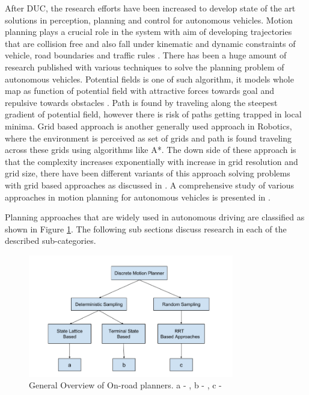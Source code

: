 After DUC, the research efforts have been increased to develop state of the art solutions in perception, planning and control for autonomous vehicles. Motion planning plays a crucial role in the system with aim of developing trajectories that are collision free and also fall under kinematic and dynamic constraints of vehicle, road boundaries and traffic rules \cite{motion_planning_techniques}. There has been a huge amount of research published with various techniques to solve the planning problem of autonomous vehicles. Potential fields is one of such algorithm, it models whole map as function of potential field with attractive forces towards goal and repulsive towards obstacles \cite{potential_field_3} \cite{potential_field_1} \cite{potential_field_2}. Path is found by traveling along the steepest gradient of potential field, however there is risk of paths getting trapped in local minima. Grid based approach is another generally used approach in Robotics, where the environment is perceived as set of grids and path is found traveling across these grids using algorithms like A*. The down side of these approach is that the complexity increases exponentially with increase in grid resolution and grid size, there have been different variants of this approach solving  problems with grid based approaches as discussed in \cite{A_star} \cite{D_star_1} \cite{kolski_thesis}. A comprehensive study of various approaches in motion planning for autonomous vehicles is presented in \cite{motion_planning_techniques} \cite{survey_planning_techniques}. 

 Planning approaches that are widely used in autonomous driving are classified as shown in Figure \ref{related_work_classification}. The following sub sections discuss research in each of the described sub-categories. 

\begin{figure}[H]
	\centering
	\includegraphics[width=0.8\textwidth]{Images/related_work/planning_division.png}
	\caption{General Overview of On-road planners. a - \cite{cmu_parallel_thesis}  \cite{diss_shui_phd_thesis} \cite{traj_planner_optimization} \cite{lattice_Gu_Tiyanu} \cite{unit_A_star} , b - \cite{kolski_thesis} \cite{real_time_traj_plan_article} \cite{darpa_urban_challenge}, c -\cite{rrt_star} \cite{rrt_urban_driv} \cite{mit_rrt}
	}
	\label{related_work_classification}
\end{figure}

